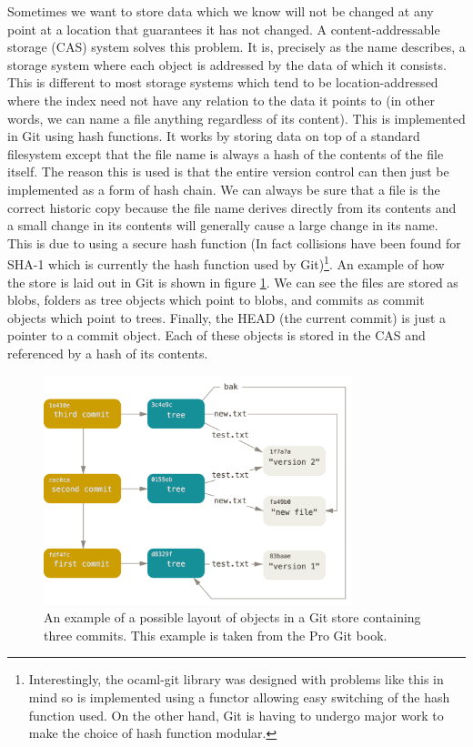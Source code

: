 Sometimes we want to store data which we know will not be changed at any point at a location that guarantees it has not changed. A content-addressable storage (CAS) system solves this problem. It is, precisely as the name describes, a storage system where each object is addressed by the data of which it consists. This is different to most storage systems which tend to be location-addressed where the index need not have any relation to the data it points to (in other words, we can name a file anything regardless of its content). This is implemented in Git using hash functions. It works by storing data on top of a standard filesystem except that the file name is always a hash of the contents of the file itself. The reason this is used is that the entire version control can then just be implemented as a form of hash chain. We can always be sure that a file is the correct historic copy because the file name derives directly from its contents and a small change in its contents will generally cause a large change in its name. This is due to using a secure hash function (In fact collisions have been found for SHA-1 which is currently the hash function used by Git)\footnote{Interestingly, the ocaml-git library was designed with problems like this in mind so is implemented using a functor allowing easy switching of the hash function used. On the other hand, Git is having to undergo major work to make the choice of hash function modular\cite{git_transition}.}. An example of how the store is laid out in Git is shown in figure \ref{fig:gitdatamodel}. We can see the files are stored as blobs, folders as tree objects which point to blobs, and commits as commit objects which point to trees. Finally, the HEAD (the current commit) is just a pointer to a commit object. Each of these objects is stored in the CAS and referenced by a hash of its contents.

\begin{figure}[h]
  \center
  \includegraphics[width=0.8\textwidth]{figs/git-data-model}
  \caption{An example of a possible layout of objects in a Git store containing three commits. This example is taken from the Pro Git book\cite{chacon2014git}.}
  \label{fig:gitdatamodel}
\end{figure}

